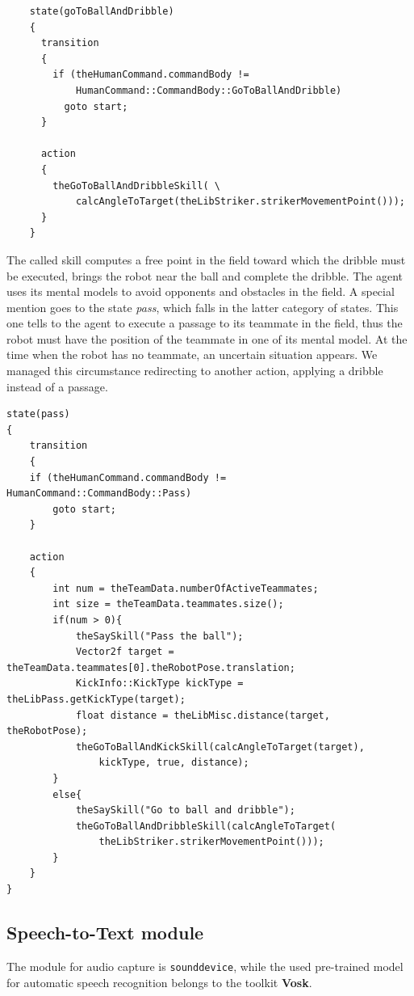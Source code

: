 \documentclass[a4paper, onecolumn, 12pt]{article}
\begin{document}
\begin{verbatim}
    state(goToBallAndDribble)
    {
      transition
      {
        if (theHumanCommand.commandBody != 
            HumanCommand::CommandBody::GoToBallAndDribble)
          goto start;
      }

      action
      {
        theGoToBallAndDribbleSkill( \
            calcAngleToTarget(theLibStriker.strikerMovementPoint()));
      }
    }
\end{verbatim}
The called skill computes a free point in the field toward which the dribble must be executed,
brings the robot near the ball and complete the dribble. The agent uses its mental models to avoid
opponents and obstacles in the field.
A special mention goes to the state \textit{pass}, which falls in the latter category of states.
This one tells to the agent to execute a passage to its teammate in the field, thus the robot
must have the position of the teammate in one of its mental model. 
At the time when the robot has no teammate, an uncertain situation appears.
We managed this circumstance redirecting to another action, applying a dribble instead of a passage.

\begin{verbatim}
state(pass)
{
    transition
    {
    if (theHumanCommand.commandBody != HumanCommand::CommandBody::Pass)
        goto start;
    }

    action
    {
        int num = theTeamData.numberOfActiveTeammates;
        int size = theTeamData.teammates.size();
        if(num > 0){
            theSaySkill("Pass the ball");
            Vector2f target = theTeamData.teammates[0].theRobotPose.translation;
            KickInfo::KickType kickType = theLibPass.getKickType(target);
            float distance = theLibMisc.distance(target, theRobotPose);
            theGoToBallAndKickSkill(calcAngleToTarget(target), 
                kickType, true, distance);
        }
        else{
            theSaySkill("Go to ball and dribble");
            theGoToBallAndDribbleSkill(calcAngleToTarget(
                theLibStriker.strikerMovementPoint()));
        }
    }
}
\end{verbatim}


\subsection{Speech-to-Text module}
The module for audio capture is \texttt{sounddevice}, 
while the used pre-trained model for automatic speech recognition belongs 
to the toolkit \textbf{Vosk}.
\end{document}
